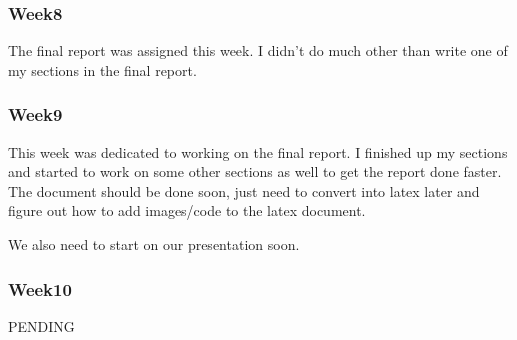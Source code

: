 	\subsubsection*{Week8}
		The final report was assigned this week. I didn't do much other than write one of my sections in the final report.
	\subsubsection*{Week9}
		This week was dedicated to working on the final report. I finished up my sections and started to work on some other sections as well to get the report done faster. The document should be done soon, just need to convert into latex later and figure out how to add images/code to the latex document.

		We also need to start on our presentation soon.
	\subsubsection*{Week10}
		PENDING